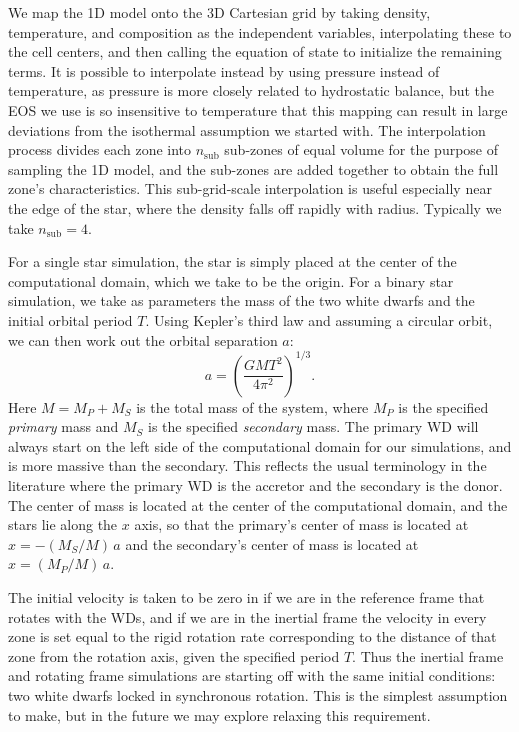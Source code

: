 \documentclass[iop]{emulateapj}
\begin{document}
We map the 1D model onto the 3D Cartesian grid by taking density,
temperature, and composition as the independent variables,
interpolating these to the cell centers, and then calling the equation
of state to initialize the remaining terms. It is possible to interpolate
instead by using pressure instead of temperature, as pressure is more 
closely related to hydrostatic balance, but the EOS we use is so 
insensitive to temperature that this mapping can result in large 
deviations from the isothermal assumption we started with.  The 
interpolation process divides each zone into $n_{\text{sub}}$ 
sub-zones of equal volume for
the purpose of sampling the 1D model, and the sub-zones are added
together to obtain the full zone's characteristics. This
sub-grid-scale interpolation is useful especially near the edge of the star,
where the density falls off rapidly with radius. Typically we take 
$n_{\text{sub}} = 4$.

For a single star simulation, the star is simply placed at the center
of the computational domain, which we take to be the origin. For a
binary star simulation, we take as parameters the mass of the two
white dwarfs and the initial orbital period $T$. Using Kepler's third
law and assuming a circular orbit, we can then work out the orbital
separation $a$:
\begin{equation}
  a = \left(\frac{GM T^2}{4\pi^2}\right)^{1/3}.
\end{equation}
Here $M = M_P + M_S$ is the total mass of the system, where $M_P$ is
the specified \textit{primary} mass and $M_S$ is the specified
\textit{secondary} mass. The primary WD will always start on the left
side of the computational domain for our simulations, and is more
massive than the secondary. This reflects the usual terminology in the
literature where the primary WD is the accretor and the secondary is
the donor. The center of mass is located at the center of the
computational domain, and the stars lie along the $x$ axis, so that
the primary's center of mass is located at $x = -(M_S / M)\, a$ and
the secondary's center of mass is located at $x = (M_P / M)\, a$.

The initial velocity is taken to be zero in if we are in the reference
frame that rotates with the WDs, and if we are in the inertial frame
the velocity in every zone is set equal to the rigid rotation rate 
corresponding to the distance of that zone from the rotation axis, given
the specified period $T$. Thus the inertial frame and rotating frame 
simulations are starting off with the same initial conditions: two white 
dwarfs locked in synchronous rotation. This is the simplest assumption to 
make, but in the future we may explore relaxing this requirement.
\end{document}
